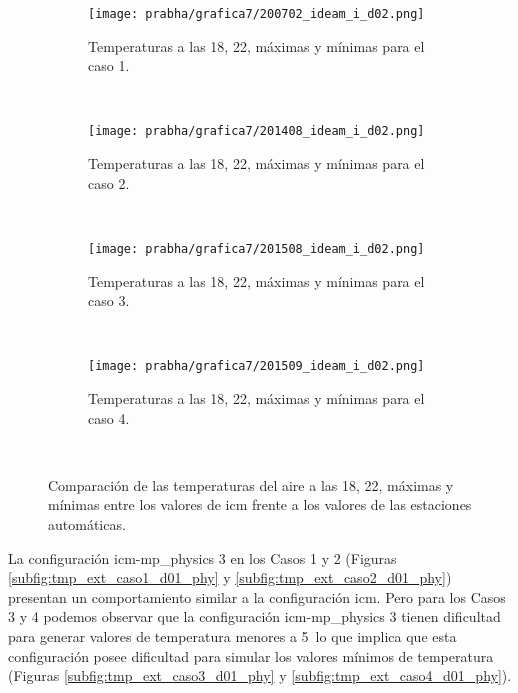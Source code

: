 \begin{figure}[H]
    \centering
    \begin{subfigure}[b]{0.45\textwidth}
        \caption{Temperaturas a las 18, 22, máximas y mínimas para el caso 1.}
	\texttt{[image: prabha/grafica7/200702\_ideam\_i\_d02.png]}
    \label{subfig:tmp_ext_caso1_d01}
	\end{subfigure}
	~
	    \begin{subfigure}[b]{0.45\textwidth}
        \caption{Temperaturas a las 18, 22, máximas y mínimas para el caso 2.}
	\texttt{[image: prabha/grafica7/201408\_ideam\_i\_d02.png]}

    \label{subfig:tmp_ext_caso2_d01}
	\end{subfigure}
	~
	    \begin{subfigure}[b]{0.45\textwidth}
        \caption{Temperaturas a las 18, 22, máximas y mínimas para el caso 3.}
	\texttt{[image: prabha/grafica7/201508\_ideam\_i\_d02.png]}
    \label{subfig:tmp_ext_caso3_d01}
	\end{subfigure}
	~
	    \begin{subfigure}[b]{0.45\textwidth}
        \caption{Temperaturas a las 18, 22, máximas y mínimas para el caso 4.}
	\texttt{[image: prabha/grafica7/201509\_ideam\_i\_d02.png]}
    
    \label{subfig:tmp_ext_caso4_d01}
	\end{subfigure}
	~

\caption{Comparación de las temperaturas del aire a las 18, 22, máximas y mínimas entre los valores de icm frente a los valores de las estaciones automáticas.}	
\label{subfig:tmp_ext_d01}	
\end{figure}


La configuración icm-mp\_physics 3 en los Casos 1 y 2 (Figuras \ref{subfig:tmp_ext_caso1_d01_phy} y \ref{subfig:tmp_ext_caso2_d01_phy}) presentan un comportamiento similar a la configuración icm. Pero para los Casos 3 y 4 podemos observar que la configuración icm-mp\_physics 3 tienen dificultad para generar valores de temperatura menores a 5\celc\ lo que implica que esta configuración posee dificultad para simular los valores mínimos de temperatura (Figuras \ref{subfig:tmp_ext_caso3_d01_phy} y \ref{subfig:tmp_ext_caso4_d01_phy}).

